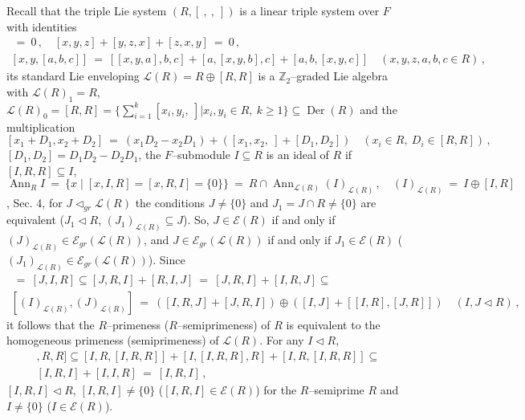 \documentclass[a4paper,11pt]{article}
\DeclareMathOperator{\Der}{Der}
\DeclareMathOperator{\Ann}{Ann}
\begin{document}
Recall that the triple Lie system ${(R, [\ ,\ ,\ ])}$ is a linear triple system 
over $F$ with identities 
\begin{gather*}
[x, x, y]\ =\ 0\,,\quad [x, y, z]+[y, z, x]+[z, x, y]\ =\ 0\,,
\\
[x, y, [a, b, c]]\ =\ [[x, y, a], b, c]+[a, [x, y, b], c]+
[a, b, [x, y, c]]\quad (x, y, z, a, b, c\in R)\,,
\end{gather*}
its standard Lie enveloping ${\mathcal{L}(R)=R\oplus [R, R]}$ is a  
$\mathbb{Z}_2$--graded Lie algebra with ${\mathcal{L}(R)_1=R}$, 
${\mathcal{L}(R)_0=[R, R]=\biggl\{\sum\limits_{i=1}^k [x_i, y_i,\ ]\biggl| 
x_i, y_i\in R,\ k\geq 1\biggr\}\subseteq \Der(R)}$ and the multiplication 
\[
[x_1+D_1, x_2+D_2]\ =\ (x_1 D_2-x_2 D_1)+([x_1, x_2,\ ]+[D_1, D_2])
\quad (x_i\in R,\ D_i\in [R, R])\,,
\]
${[D_1, D_2]=D_1 D_2-D_2 D_1}$, the $F$--submodule ${I\subseteq R}$ is an ideal 
of $R$ if ${[I, R, R]\subseteq I}$, 
\[
\Ann_R I\ =\ \{x\mid [x, I, R]=[x, R, I]=\{0\}\}\ =\ 
R\cap \Ann_{\mathcal{L}(R)} (I)_{\mathcal{L}(R)}\,,\quad 
(I)_{\mathcal{L}(R)}\ =\ I\oplus [I, R]
\]
\cite{QTS}, Sec. 4, for ${J\lhd_{gr} \mathcal{L}(R)}$ the conditions 
${J\ne \{0\}}$ and ${J_1=J\cap R\ne \{0\}}$ are equivalent (${J_1\lhd R}$, 
${(J_1)_{\mathcal{L}(R)}\subseteq J}$). So, 
${J\in \mathcal{E}(R)}$ if and only if 
${(J)_{\mathcal{L}(R)}\in \mathcal{E}_{gr}(\mathcal{L}(R))}$, and  
${J\in \mathcal{E}_{gr}(\mathcal{L}(R))}$ if and only if 
${J_1\in \mathcal{E}(R)}$                                         
(${(J_1)_{\mathcal{L}(R)}\in \mathcal{E}_{gr}(\mathcal{L}(R))}$). Since 
\begin{multline*}
[I, J, R]\ =\ [J, I, R]\subseteq [J, R, I]+[R, I, J]\ =\ 
[J, R, I]+[I, R, J]\subseteq
\\ 
[(I)_{\mathcal{L}(R)}, (J)_{\mathcal{L}(R)}]\ =\ 
([I, R, J]+[J, R, I])\oplus ([I, J]+[[I, R], [J, R]])\quad (I, J\lhd R)\,,
\end{multline*}
it follows that the $R$--primeness ($R$--semiprimeness) of $R$ is equivalent 
to the homogeneous primeness (semiprimeness) of $\mathcal{L}(R)$. For any 
${I\lhd R}$, 
\begin{multline*}
[[I, R, I], R, R]\subseteq 
[I, R, [I, R, R]]+[I, [I, R, R], R]+[I, R, [I, R, R]]\subseteq
\\ 
[I, R, I]+[I, I, R]\ =\ [I, R, I]\,,
\end{multline*}
${[I, R, I]\lhd R}$, ${[I, R, I]\ne \{0\}}$ (${[I, R, I]\in \mathcal{E}(R)}$)
for the $R$--semiprime $R$ and ${I\ne \{0\}}$ (${I\in \mathcal{E}(R)}$).  
\end{document}
